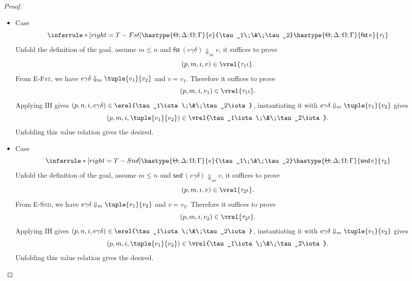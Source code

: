 \begin{proof}
\begin{itemize}
\item Case
\[
  \inferrule*[right=T-Fst]
        {\hastype{\Theta;\Delta;\Omega;\Gamma}{e}{\tau_1\;\&\;\tau_2}}
        {\hastype{\Theta;\Delta;\Omega;\Gamma}{\mathsf{fst}\,e}{\tau_1}}
\]
Unfold the definition of the goal, assume $m\leq n$ and
$\mathsf{fst}\,(e\gamma\delta)\Downarrow_m v$, it suffices to prove
\[(p, m, i, v)\in\vrel{\tau_1\iota}.\]
From \textsc{E-Fst}, we have $e\gamma\delta \Downarrow_m\tuple{v_1}{v_2}$ and $v = v_1$.
Therefore it suffices to prove
\[(p, m, i, v_1) \in\vrel{\tau_1\iota}.\]
Applying IH gives $(p, n, i, e\gamma\delta) \in \erel{\tau_1\iota\;\&\;\tau_2\iota}$, instantiating it with
$e\gamma\delta \Downarrow_m\tuple{v_1}{v_2}$ gives
\[(p, m, i, \tuple{v_1}{v_2}) \in \vrel{\tau_1\iota\;\&\;\tau_2\iota}.\]
Unfolding this value relation gives the desired.

\item Case
\[
  \inferrule*[right=T-Snd]
        {\hastype{\Theta;\Delta;\Omega;\Gamma}{e}{\tau_1\;\&\;\tau_2}}
        {\hastype{\Theta;\Delta;\Omega;\Gamma}{\mathsf{snd}\,e}{\tau_2}}
\]
Unfold the definition of the goal, assume $m\leq n$ and
$\mathsf{snd}\,(e\gamma\delta)\Downarrow_m v$, it suffices to prove
\[(p, m, i, v)\in\vrel{\tau_2\iota}.\]
From \textsc{E-Snd}, we have $e\gamma\delta \Downarrow_m\tuple{v_1}{v_2}$ and $v = v_2$.
Therefore it suffices to prove
\[(p, m, i, v_2) \in\vrel{\tau_2\iota}.\]
Applying IH gives $(p, n, i, e\gamma\delta) \in \erel{\tau_1\iota\;\&\;\tau_2\iota}$, instantiating it with
$e\gamma\delta \Downarrow_m\tuple{v_1}{v_2}$ gives
\[(p, m, i, \tuple{v_1}{v_2}) \in \vrel{\tau_1\iota\;\&\;\tau_2\iota}.\]
Unfolding this value relation gives the desired.


\end{itemize}
\end{proof}
